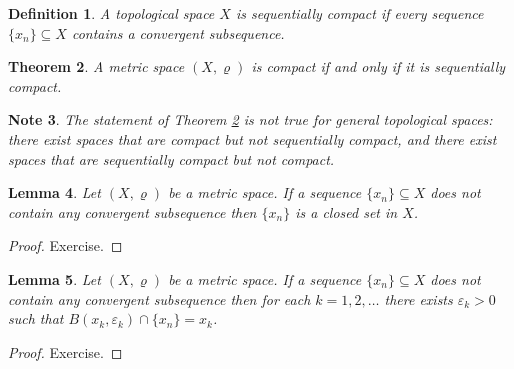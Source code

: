 \documentclass[11pt, letterpaper, oneside]{report}
\theoremstyle{pplain}
\newtheorem{theorem}{Theorem}[chapter]
\newtheorem{lemma}[theorem]{Lemma}
\newtheorem{ITERMVALUE THM}[theorem]{Intermediate Value Theorem}
\newtheorem{HEINEBOREL THM}[theorem]{Heine-Borel Theorem}
\newtheorem{UMETR THM}[theorem]{Urysohn Metrization Theorem}
\newtheorem{UMETR2 THM}[theorem]{Urysohn Metrization Theorem (v.2)}
\theoremstyle{ddefinition}
\newtheorem{definition}[theorem]{Definition}
\newtheorem{note}[theorem]{Note}
\theoremstyle{nnn}
\newtheorem{TDA NN}[theorem]{Topological Data Analysis. }
\theoremstyle{eexercise}
\begin{document}
\begin{definition}
\label{SEQ COMPACT DEF}
A topological space  $X$ is \emph{sequentially compact} if every sequence 
$\{x_{n}\}\subseteq X$ contains a convergent subsequence. 
\end{definition}

\begin{theorem}
\label{COMPACT METRIC THM}
A metric space $(X, \varrho)$ is compact if and only if it is sequentially compact.
\end{theorem}

\begin{note}
The statement of Theorem \ref{COMPACT METRIC THM} is not true for  general topological spaces:  
there exist  spaces that are compact but not  sequentially compact, and there exist  spaces that 
are sequentially compact but not compact.
\end{note}

\begin{lemma}
\label{NONCONV SUBSEQ CLOSED LEMMA}
Let $(X, \varrho)$ be a metric space. If a sequence $\{x_{n} \}\subseteq X$
does not contain any convergent subsequence then  $\{x_{n}\}$ is a closed set in $X$. 
\end{lemma}

\begin{proof}
Exercise.
\end{proof}

\begin{lemma}
\label{NONCONV SUBSEQ BALL LEMMA}
Let $(X, \varrho)$ be a metric space. If a sequence $\{x_{n} \}\subseteq X$
does not contain any convergent subsequence then for each $k=1, 2, \dots $ there exists 
$\varepsilon_{k} >0$ such that $B(x_{k}, \varepsilon_{k})\cap \{ x_{n}\} = x_{k}$.
\end{lemma}


\begin{proof}
Exercise.
\end{proof}
\end{document}

